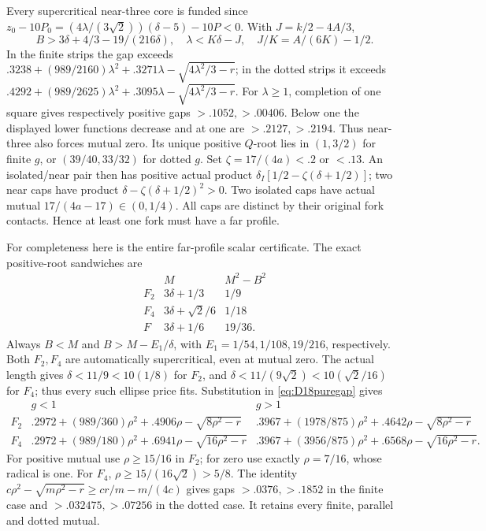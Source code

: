 Every supercritical near-three core is funded since
\(z_0-10P_0=(4\lambda/(3\sqrt2))(\delta-5)-10P<0\).
With \(J=k/2-4A/3\),
\[
 B>3\delta+4/3-19/(216\delta),\quad
 \lambda<K\delta-J,\quad J/K=A/(6K)-1/2 .
\]
In the finite strips the gap exceeds
\(.3238+(989/2160)\lambda^2+.3271\lambda
-\sqrt{4\lambda^2/3-r}\);
in the dotted strips it exceeds
\(.4292+(989/2625)\lambda^2+.3095\lambda
-\sqrt{4\lambda^2/3-r}\).
For \(\lambda\geq1\), completion of one square gives respectively
positive gaps \(>.1052,>.00406\).
Below one the displayed lower functions decrease and at one are
\(>.2127,>.2194\).
Thus near-three also forces mutual zero.
Its unique positive \(Q\)-root lies in \((1,3/2)\) for finite
\(g\), or \((39/40,33/32)\) for dotted \(g\).
Set \(\zeta=17/(4a)<.2\) or \(<.13\).
An isolated/near pair then has positive actual product
\(\delta_I[1/2-\zeta(\delta+1/2)]\);
two near caps have product
\(\delta-\zeta(\delta+1/2)^2>0\).
Two isolated caps have actual mutual
\(17/(4a-17)\in(0,1/4)\).
All caps are distinct by their original fork contacts.
Hence at least one fork must have a far profile.

For completeness here is the entire far-profile scalar certificate.
The exact positive-root sandwiches are
\[
\begin{array}{c|c|c}
 &M&M^2-B^2\\ \hline
F_2&3\delta+1/3&1/9\\
F_4&3\delta+\sqrt2/6&1/18\\
F&3\delta+1/6&19/36 .
\end{array}
\]
Always \(B<M\) and
\(B>M-E_1/\delta\), with
\(E_1=1/54,1/108,19/216\), respectively.
Both \(F_2,F_4\) are automatically supercritical, even at mutual zero.
The actual length gives
\(\delta<11/9<10(1/8)\) for \(F_2\), and
\(\delta<11/(9\sqrt2)<10(\sqrt2/16)\) for \(F_4\);
thus every such ellipse price fits.
Substitution in \eqref{eq:D18puregap} gives
\[
\begin{array}{c|c|c}
 &g<1&g>1\\ \hline
F_2&
 .2972+(989/360)\rho^2+.4906\rho-\sqrt{8\rho^2-r}&
 .3967+(1978/875)\rho^2+.4642\rho-\sqrt{8\rho^2-r}\\
F_4&
 .2972+(989/180)\rho^2+.6941\rho-\sqrt{16\rho^2-r}&
 .3967+(3956/875)\rho^2+.6568\rho-\sqrt{16\rho^2-r}.
\end{array}
\]
For positive mutual use \(\rho\geq15/16\) in \(F_2\);
for zero use exactly \(\rho=7/16\), whose radical is one.
For \(F_4\), \(\rho\geq15/(16\sqrt2)>5/8\).
The identity
\(c\rho^2-\sqrt{m\rho^2-r}\geq cr/m-m/(4c)\)
gives gaps \(>.0376,>.1852\) in the finite case and
\(>.032475,>.07256\) in the dotted case.
It retains every finite, parallel and dotted mutual.

